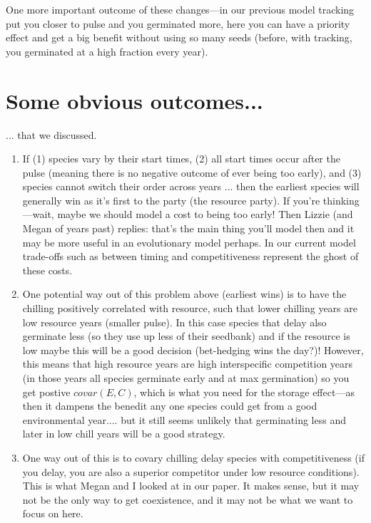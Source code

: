 \documentclass[11pt,letter]{article}
\begin{document}
One more important outcome of these changes---in our previous model tracking put you closer to pulse and you germinated more, here you can have a priority effect and get a big benefit without using so many seeds (before, with tracking, you germinated at a high fraction every year). 

\section{Some obvious outcomes...}
... that we discussed.

\begin{enumerate}
\item If (1) species vary by their start times, (2) all start times occur after the pulse (meaning there is no negative outcome of ever being too early), and (3) species cannot switch their order across years ... then the earliest species will generally win as it's first to the party (the resource party). If you're thinking---wait, maybe we should model a cost to being too early! Then Lizzie (and Megan of years past) replies: that's the main thing you'll model then and it may be more useful in an evolutionary model perhaps. In our current model trade-offs such as between timing and competitiveness represent the ghost of these costs. 
\item One potential way out of this problem above (earliest wins) is to have the chilling positively correlated with resource, such that lower chilling years are low resource years (smaller pulse). In this case species that delay also germinate less (so they use up less of their seedbank) and if the resource is low maybe this will be a good decision (bet-hedging wins the day?)! However, this means that high resource years are high interspecific competition years (in those years all species germinate early and at max germination) so you get postive $covar(E,C)$, which is what you need for the storage effect---as then it dampens the benedit any one species could get from a good environmental year.... but it still seems unlikely that germinating less and later in low chill years will be a good strategy.
\item One way out of this is to covary chilling delay species with competitiveness (if you delay, you are also a superior competitor under low resource conditions). This is what Megan and I looked at in our paper. It makes sense, but it may not be the only way to get coexistence, and it may not be what we want to focus on here. 
\end{enumerate}
\end{document}

